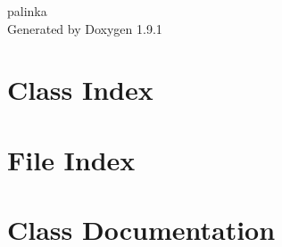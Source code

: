 \let\mypdfximage\pdfximage\def\pdfximage{\immediate\mypdfximage}\documentclass[twoside]{book}
\newcommand{\+}{\discretionary{\mbox{\scriptsize$\hookleftarrow$}}{}{}}
\newcommand{\clearemptydoublepage}{%
  \newpage{\pagestyle{empty}\cleardoublepage}%
}
\begin{document}
\raggedbottom

\hypersetup{pageanchor=false,
             bookmarksnumbered=true,
             pdfencoding=unicode
            }
\begin{titlepage}
\vspace*{7cm}
\begin{center}%
{\Large palinka }\\
\vspace*{1cm}
{\large Generated by Doxygen 1.9.1}\\
\end{center}
\end{titlepage}
\clearemptydoublepage
{}
\tableofcontents
\clearemptydoublepage
{}
\hypersetup{pageanchor=true}

\chapter{Class Index}

\chapter{File Index}

\chapter{Class Documentation}







































\end{document}
